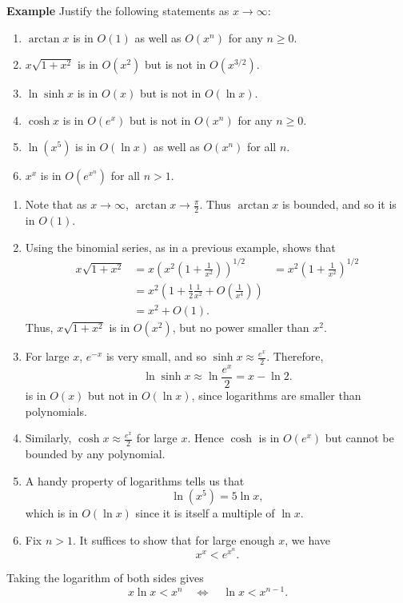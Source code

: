 \documentclass[a4paper]{book}
\begin{document}
\begin{sloppypar}
\textbf{Example} Justify the following statements as $x \rightarrow \infty$:
\begin{enumerate}
	\item $\arctan x$ is in $O(1)$ as well as $O(x^n)$ for any $n \geq 0$.
	\item $x \sqrt{1+x^2}$ is in $O(x^2)$ but is not in $O(x^{3/2})$.
	\item $\ln \sinh x$ is in $O(x)$ but is not in $O(\ln x)$.
	\item $\cosh x$ is in $O(e^x)$ but is not in $O(x^n)$ for any $n \geq 0$.
	\item $\ln (x^5)$ is in $O(\ln x)$ as well as $O(x^n)$ for all $n$.
	\item $x^x$ is in $O(e^{x^n})$ for all $n>1$.
\end{enumerate}
\begin{examplebox}
\begin{enumerate}
	\item Note that as $x \rightarrow \infty$, $\arctan x \rightarrow \frac{\pi}{2}$. Thus $\arctan x$ is bounded, and so it is in $O(1)$.
	\item Using the binomial series, as in a previous example, shows that
	\begin{align*}
	x \sqrt{1 + x^2} &= x \left(x^2\left(1+ \frac{1}{x^2}\right)\right)^{1/2} 
	&= x^2 \left(1+ \frac{1}{x^2}\right)^{1/2} \\
	&= x^2 \left( 1 + \frac{1}{2}\frac{1}{x^2} + O\left(\frac{1}{x^4}\right) \right) \\
	&= x^2 + O(1). 
	\end{align*}
	Thus, $x \sqrt{1+x^2}$ is in $O(x^2)$, but no power smaller than $x^2$.
	\item For large $x$, $e^{-x}$ is very small, and so $\sinh x \approx \frac{e^x}{2}$. Therefore, \[ \ln \sinh x \approx \ln \frac{e^x}{2} = x - \ln 2. \] is in $O(x)$ but not in $O(\ln x)$, since logarithms are smaller than polynomials.
	\item Similarly, $\cosh x \approx \frac{e^x}{2}$ for large $x$. Hence $\cosh$ is in $O(e^x)$ but cannot be bounded by any polynomial.
	\item A handy property of logarithms tells us that \[ \ln (x^5) = 5 \ln x, \] which is in $O(\ln x)$ since it is itself a multiple of $\ln x$.
	\item Fix $n>1$. It suffices to show that for large enough $x$, we have \[ x^x < e^{x^n}. \]
\end{enumerate}
Taking the logarithm of both sides gives \[ x \ln x < x^n \quad \Leftrightarrow \quad \ln x < x^{n-1}. \]


\end{examplebox}
\end{sloppypar}
\end{document}

